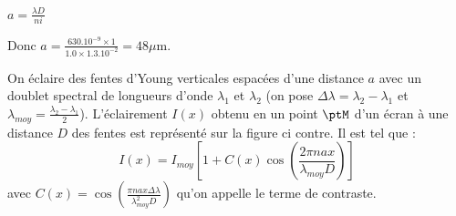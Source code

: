\begin{corrige}
	$a=\frac{\lambda D}{ni}$

	Donc $a=\frac{\num{630}.10^{-9} \times \num{1}}{\num{1.0} \times \num{1.3}.10^{-2}}=\num{48}\si{\mu\metre}$.
\end{corrige}


\finEntrainement







\hauteurLargeurCadreReponse		{6mm}{4cm}
\initialisationEntrainement

                                \initialisationPartieGauche %
On éclaire des fentes d'Young verticales espacées d'une distance $a$ avec un doublet spectral de longueurs d'onde $\lambda_1$ et $\lambda_2$ (on pose $\Delta \lambda=\lambda_2 -\lambda_1$ et $\lambda_{moy}=\frac{\lambda_2-\lambda_1}{2}$). L'éclairement $I(x)$ obtenu en un point $\ptM$ d'un écran à une distance $D$ des fentes est représenté sur la figure ci contre. Il est tel que :
$$ I(x)=I_{moy} \left[1+C(x)\cos\left(\frac{2\pi nax}{\lambda_{moy} D}\right)\right] $$ avec $C(x)=\cos\left(\frac{\pi nax \Delta \lambda}{\lambda_{moy}^2 D}\right)$ qu'on appelle le terme de contraste.

